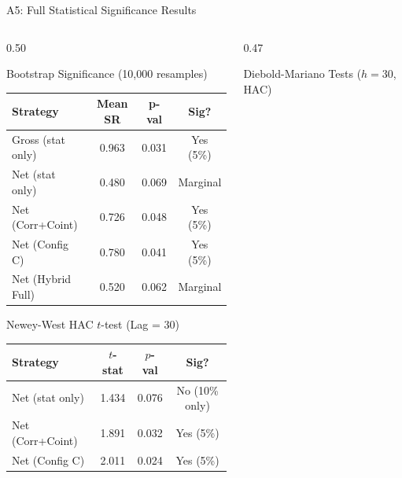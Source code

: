 \documentclass[aspectratio=169,10pt]{beamer}
\begin{document}
\begin{frame}{A5: Full Statistical Significance Results}
  \begin{columns}[T]
    \begin{column}{0.50\textwidth}
      \begin{block}{Bootstrap Significance (10,000 resamples)}
        \scriptsize\renewcommand{\arraystretch}{1.3}
        \begin{tabular}{lccc}
          \toprule
          \textbf{Strategy} & \textbf{Mean SR} & \textbf{p-val} & \textbf{Sig?} \\
          \midrule
          Gross (stat only)  & 0.963 & 0.031 & \textcolor{goodgreen}{Yes (5\%)} \\
          Net (stat only)    & 0.480 & 0.069 & \textcolor{iitbsaff}{Marginal} \\
          Net (Corr+Coint)   & 0.726 & 0.048 & \textcolor{goodgreen}{Yes (5\%)} \\
          Net (Config C)     & 0.780 & 0.041 & \textcolor{goodgreen}{Yes (5\%)} \\
          Net (Hybrid Full)  & 0.520 & 0.062 & \textcolor{iitbsaff}{Marginal} \\
          \bottomrule
        \end{tabular}
      \end{block}
      \vspace{4pt}
      \begin{block}{Newey-West HAC $t$-test (Lag = 30)}
        \scriptsize\renewcommand{\arraystretch}{1.3}
        \begin{tabular}{lccc}
          \toprule
          \textbf{Strategy} & \textbf{$t$-stat} & \textbf{$p$-val} & \textbf{Sig?} \\
          \midrule
          Net (stat only)   & 1.434 & 0.076 & No (10\% only) \\
          Net (Corr+Coint)  & 1.891 & 0.032 & \textcolor{goodgreen}{Yes (5\%)} \\
          Net (Config C)    & 2.011 & 0.024 & \textcolor{goodgreen}{Yes (5\%)} \\
          \bottomrule
        \end{tabular}
      \end{block}
    \end{column}
    \begin{column}{0.47\textwidth}
      \begin{block}{Diebold-Mariano Tests ($h=30$, HAC)}
        \scriptsize\renewcommand{\arraystretch}{1.3}

\end{block}
\end{column}
\end{columns}
\end{frame}
\end{document}
